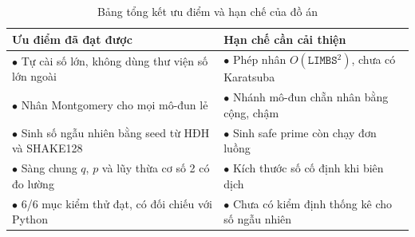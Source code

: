 \begin{table}[h!]
\centering
\begin{tabular}{p{7cm}p{7cm}}
\toprule
\textbf{Ưu điểm đã đạt được} & \textbf{Hạn chế cần cải thiện} \\
\midrule
$\bullet$ Tự cài số lớn, không dùng thư viện số lớn ngoài & $\bullet$ Phép nhân $O(\texttt{LIMBS}^2)$, chưa có Karatsuba \\
$\bullet$ Nhân Montgomery cho mọi mô-đun lẻ & $\bullet$ Nhánh mô-đun chẵn nhân bằng cộng, chậm \\
$\bullet$ Sinh số ngẫu nhiên bằng seed từ HĐH và SHAKE128 & $\bullet$ Sinh safe prime còn chạy đơn luồng \\
$\bullet$ Sàng chung $q$, $p$ và lũy thừa cơ số 2 có đo lường & $\bullet$ Kích thước số cố định khi biên dịch \\
$\bullet$ 6/6 mục kiểm thử đạt, có đối chiếu với Python & $\bullet$ Chưa có kiểm định thống kê cho số ngẫu nhiên \\
\bottomrule
\end{tabular}
\caption{Bảng tổng kết ưu điểm và hạn chế của đồ án}
\label{tab:danh-gia-tong-ket}
\end{table}
